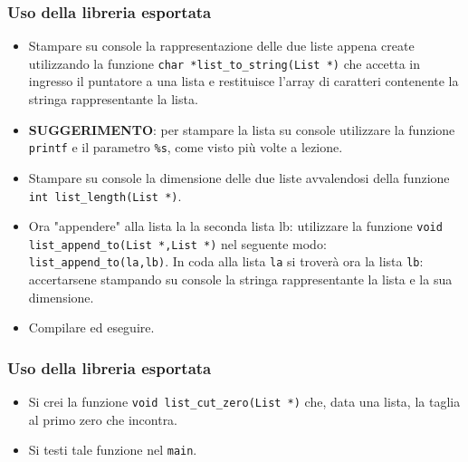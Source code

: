 \documentclass{beamer}
\begin{document}
\begin{frame}[fragile]
\frametitle{Uso della libreria esportata}
\begin{itemize}
 \item Stampare su console la rappresentazione delle due liste appena create utilizzando la funzione \texttt{char *list\_to\_string(List *)} che accetta in ingresso il puntatore a una lista e restituisce l'array di caratteri contenente la stringa rappresentante la lista. \item \textbf{SUGGERIMENTO}: per stampare la lista su console utilizzare la funzione \texttt{printf} e il parametro \texttt{\%s}, come visto più volte a lezione.
 \item Stampare su console la dimensione delle due liste avvalendosi della funzione \texttt{int list\_length(List *)}.
 \item Ora "appendere" alla lista la la seconda lista lb: utilizzare la funzione \texttt{void list\_append\_to(List *,List *)} nel seguente modo: \texttt{list\_append\_to(la,lb)}. In coda alla lista \texttt{la} si troverà ora la lista \texttt{lb}: accertarsene stampando su console la stringa rappresentante la lista e la sua dimensione.
 \item Compilare ed eseguire.
\end{itemize}
\end{frame}


\begin{frame}[fragile]
\frametitle{Uso della libreria esportata}
\begin{itemize}
 \item Si crei la funzione \texttt{void list\_cut\_zero(List *)} che, data una lista, la taglia al primo zero che incontra.
 \item Si testi tale funzione nel \texttt{main}.
\end{itemize}
\end{frame}
\end{document}
